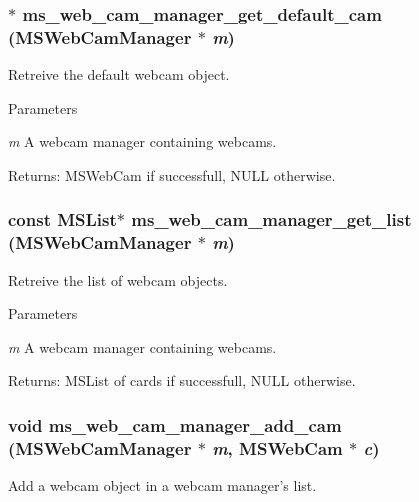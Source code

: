 \subsubsection[{ms\_\-web\_\-cam\_\-manager\_\-get\_\-default\_\-cam}]{$\ast$ ms\_\-web\_\-cam\_\-manager\_\-get\_\-default\_\-cam ({\bf MSWebCamManager} $\ast$ {\em m})}\label{group__mediastreamer2__webcam_gaf04de06bd612fc1d4a735d44c4f8091c}
Retreive the default webcam object.


\begin{DoxyParams}{Parameters}
\item[{\em m}]A webcam manager containing webcams.\end{DoxyParams}
Returns: MSWebCam if successfull, NULL otherwise. 
\subsubsection[{ms\_\-web\_\-cam\_\-manager\_\-get\_\-list}]{\setlength{\rightskip}{0pt plus 5cm}const MSList$\ast$ ms\_\-web\_\-cam\_\-manager\_\-get\_\-list ({\bf MSWebCamManager} $\ast$ {\em m})}\label{group__mediastreamer2__webcam_ga312eb8452b0512d0cc269dd2c78e54c9}
Retreive the list of webcam objects.


\begin{DoxyParams}{Parameters}
\item[{\em m}]A webcam manager containing webcams.\end{DoxyParams}
Returns: MSList of cards if successfull, NULL otherwise. 
\subsubsection[{ms\_\-web\_\-cam\_\-manager\_\-add\_\-cam}]{\setlength{\rightskip}{0pt plus 5cm}void ms\_\-web\_\-cam\_\-manager\_\-add\_\-cam ({\bf MSWebCamManager} $\ast$ {\em m}, \/  {\bf MSWebCam} $\ast$ {\em c})}\label{group__mediastreamer2__webcam_gad2d3add8ced0a3e680263c242789d755}
Add a webcam object in a webcam manager's list.


